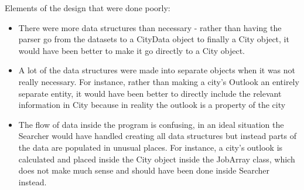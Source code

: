 \documentclass[12pt,fleqn]{article}
\begin{document}
Elements of the design that were done poorly: \\
\begin{itemize}
\item There were more data structures than necessary - rather than having the parser go from the datasets to a CityData object to finally a City object, it would have been better to make it go directly to a City object.
\item A lot of the data structures were made into separate objects when it was not really necessary. For instance, rather than making a city’s Outlook an entirely separate entity, it would have been better to directly include the relevant information in City because in reality the outlook is a property of the city
\item The flow of data inside the program is confusing, in an ideal situation the Searcher would have handled creating all data structures but instead parts of the data are populated in unusual places. For instance, a city’s outlook is calculated and placed inside the City object inside the JobArray class, which does not make much sense and should have been done inside Searcher instead.
\end {itemize}
\end{document}
